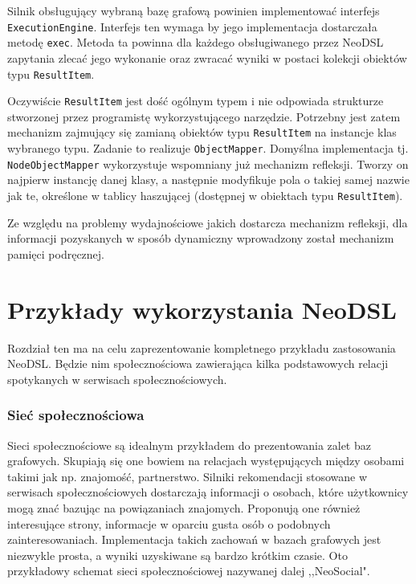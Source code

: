 \documentclass[brudnopis]{xmgr}
\begin{document}
Silnik obsługujący wybraną bazę grafową powinien implementować interfejs \texttt{ExecutionEngine}. Interfejs ten wymaga by jego implementacja dostarczała metodę \texttt{exec}. Metoda ta powinna dla każdego obsługiwanego przez NeoDSL zapytania zlecać jego wykonanie oraz zwracać wyniki w postaci kolekcji obiektów typu \texttt{ResultItem}.

Oczywiście \texttt{ResultItem} jest dość ogólnym typem i nie odpowiada strukturze stworzonej przez programistę wykorzystującego narzędzie. Potrzebny jest zatem mechanizm zajmujący się zamianą obiektów typu \texttt{ResultItem} na instancje klas wybranego typu. Zadanie to realizuje \texttt{ObjectMapper}. Domyślna implementacja tj. \texttt{NodeObjectMapper} wykorzystuje wspomniany już mechanizm refleksji. Tworzy on najpierw instancję danej klasy, a następnie modyfikuje pola o takiej samej nazwie jak te, określone w tablicy haszującej (dostępnej w obiektach typu \texttt{ResultItem}).

Ze względu na problemy wydajnościowe jakich dostarcza mechanizm refleksji, dla informacji pozyskanych w sposób dynamiczny wprowadzony został mechanizm pamięci podręcznej.

\chapter{Przykłady wykorzystania NeoDSL}

Rozdział ten ma na celu zaprezentowanie kompletnego przykładu zastosowania NeoDSL. Będzie nim społecznościowa zawierająca kilka podstawowych relacji spotykanych w serwisach społecznościowych.

\subsection{Sieć społecznościowa}

Sieci społecznościowe są idealnym przykładem do prezentowania zalet baz grafowych. Skupiają się one bowiem na relacjach występujących między osobami takimi jak np. znajomość, partnerstwo. Silniki rekomendacji stosowane w serwisach społecznościowych dostarczają informacji o osobach, które użytkownicy mogą znać bazując na powiązaniach znajomych. Proponują one również interesujące strony, informacje w oparciu gusta osób o podobnych zainteresowaniach. Implementacja takich zachowań w bazach grafowych jest niezwykle prosta, a wyniki uzyskiwane są bardzo krótkim czasie. Oto przykładowy schemat sieci społecznościowej nazywanej dalej ,,NeoSocial".
\end{document}
